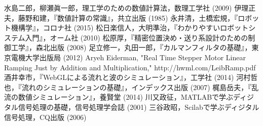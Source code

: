 \documentclass[twocolumn,oneside,a4paper]{article}
\begin{document}
\begin{thebibliography}{99}
    水島二郎，柳瀬眞一郎，理工学のための数値計算法，数理工学社 (2009)
   伊理正夫，藤野和建，『数値計算の常識』，共立出版 (1985)
    永井清，土橋宏規，『ロボット機構学』，コロナ社 (2015)
     松日楽信人，大明準治，『わかりやすいロボットシステム入門』，オーム社 (2010)
     松原厚，『精密位置決め・送り系設計のための制御工学』，森北出版 (2008)
   足立修一，丸田一郎，『カルマンフィルタの基礎』，東京電機大学出版局 (2012)
   Aryeh Eiderman, "Real Time Stepper Motor Linear Ramping Just by Addition and Multiplication," http://hwml.com/LeibRamp.pdf
   酒井幸市，『WebGLによる流れと波のシミュレーション』，工学社 (2014)
   河村哲也，『流れのシミュレーションの基礎』，インデックス出版 (2007)
    梶島岳夫，『乱流の数値シミュレーション』，養賢堂 (2014)
    川又政征，MATLABで学ぶディジタル信号処理の基礎，信号処理学会誌 (2001)
    三谷政昭，Scilabで学ぶディジタル信号処理，CQ出版 (2006)
\end{thebibliography}
\end{document}
